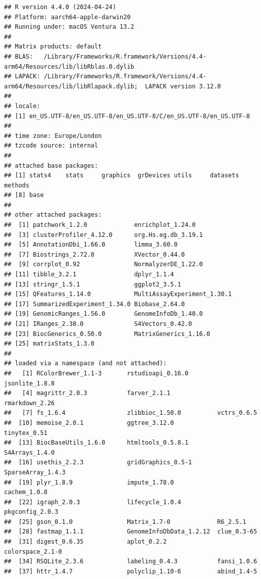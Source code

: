 \documentclass[9pt,a4paper,]{extarticle}
\begin{document}
\begin{verbatim}
## R version 4.4.0 (2024-04-24)
## Platform: aarch64-apple-darwin20
## Running under: macOS Ventura 13.2
## 
## Matrix products: default
## BLAS:   /Library/Frameworks/R.framework/Versions/4.4-arm64/Resources/lib/libRblas.0.dylib 
## LAPACK: /Library/Frameworks/R.framework/Versions/4.4-arm64/Resources/lib/libRlapack.dylib;  LAPACK version 3.12.0
## 
## locale:
## [1] en_US.UTF-8/en_US.UTF-8/en_US.UTF-8/C/en_US.UTF-8/en_US.UTF-8
## 
## time zone: Europe/London
## tzcode source: internal
## 
## attached base packages:
## [1] stats4    stats     graphics  grDevices utils     datasets  methods  
## [8] base     
## 
## other attached packages:
##  [1] patchwork_1.2.0             enrichplot_1.24.0          
##  [3] clusterProfiler_4.12.0      org.Hs.eg.db_3.19.1        
##  [5] AnnotationDbi_1.66.0        limma_3.60.0               
##  [7] Biostrings_2.72.0           XVector_0.44.0             
##  [9] corrplot_0.92               NormalyzerDE_1.22.0        
## [11] tibble_3.2.1                dplyr_1.1.4                
## [13] stringr_1.5.1               ggplot2_3.5.1              
## [15] QFeatures_1.14.0            MultiAssayExperiment_1.30.1
## [17] SummarizedExperiment_1.34.0 Biobase_2.64.0             
## [19] GenomicRanges_1.56.0        GenomeInfoDb_1.40.0        
## [21] IRanges_2.38.0              S4Vectors_0.42.0           
## [23] BiocGenerics_0.50.0         MatrixGenerics_1.16.0      
## [25] matrixStats_1.3.0          
## 
## loaded via a namespace (and not attached):
##   [1] RColorBrewer_1.1-3       rstudioapi_0.16.0        jsonlite_1.8.8          
##   [4] magrittr_2.0.3           farver_2.1.1             rmarkdown_2.26          
##   [7] fs_1.6.4                 zlibbioc_1.50.0          vctrs_0.6.5             
##  [10] memoise_2.0.1            ggtree_3.12.0            tinytex_0.51            
##  [13] BiocBaseUtils_1.6.0      htmltools_0.5.8.1        S4Arrays_1.4.0          
##  [16] usethis_2.2.3            gridGraphics_0.5-1       SparseArray_1.4.3       
##  [19] plyr_1.8.9               impute_1.78.0            cachem_1.0.8            
##  [22] igraph_2.0.3             lifecycle_1.0.4          pkgconfig_2.0.3         
##  [25] gson_0.1.0               Matrix_1.7-0             R6_2.5.1                
##  [28] fastmap_1.1.1            GenomeInfoDbData_1.2.12  clue_0.3-65             
##  [31] digest_0.6.35            aplot_0.2.2              colorspace_2.1-0        
##  [34] RSQLite_2.3.6            labeling_0.4.3           fansi_1.0.6             
##  [37] httr_1.4.7               polyclip_1.10-6          abind_1.4-5             

\end{verbatim}
\end{document}
